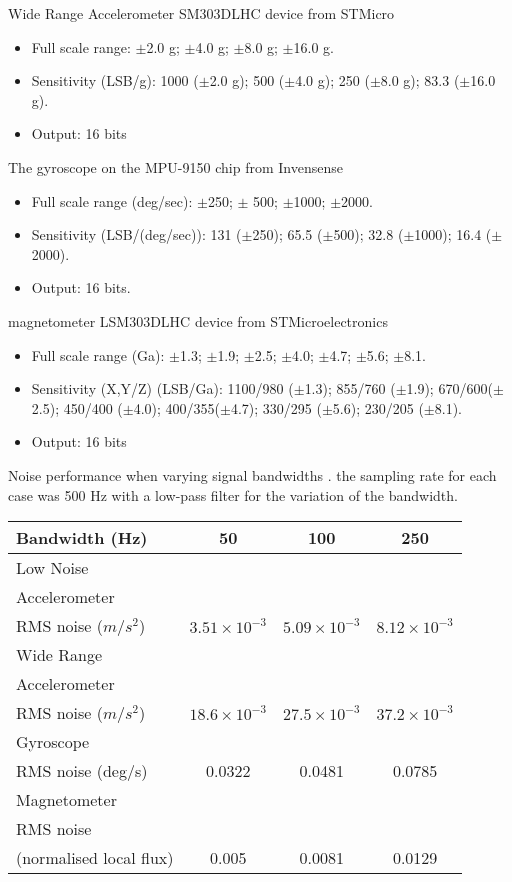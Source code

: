 Wide Range Accelerometer
SM303DLHC
device from STMicro

\begin{itemize}
  \item Full scale range: $\pm$2.0 g; $\pm$4.0 g; $\pm$8.0 g; $\pm$16.0 g.
  \item Sensitivity (LSB/g): 1000 ($\pm$2.0 g); 500 ($\pm$4.0 g); 250 ($\pm$8.0 g);
83.3 ($\pm$16.0 g).
  \item Output: 16 bits
\end{itemize}


The gyroscope on the MPU-9150 chip from Invensense
\begin{itemize}
  \item Full scale range (deg/sec): $\pm$250; $\pm$ 500; $\pm$1000; $\pm$2000.
  \item Sensitivity (LSB/(deg/sec)): 131 ($\pm$250); 65.5 ($\pm$500); 32.8 ($\pm$1000); 16.4 ($\pm$2000).
  \item Output: 16 bits.
\end{itemize}


magnetometer
LSM303DLHC device from
STMicroelectronics
\begin{itemize}
  \item Full scale range (Ga): $\pm$1.3; $\pm$1.9; $\pm$2.5; $\pm$4.0; $\pm$4.7; $\pm$5.6; $\pm$8.1.
  \item Sensitivity (X,Y/Z) (LSB/Ga): 1100/980 ($\pm$1.3); 855/760 ($\pm$1.9); 670/600($\pm$2.5); 450/400 ($\pm$4.0); 400/355($\pm$4.7); 330/295 ($\pm$5.6); 230/205 ($\pm$8.1).
  \item Output: 16 bits
\end{itemize}



Noise performance when varying signal bandwidths .
the sampling rate for each case was 500 Hz with a low-pass
filter for the variation of the bandwidth.


\begin{center}
\begin{tabular}{ |l|c|c|c| }
\hline
Bandwidth (Hz) & 50 & 100 & 250 \\
\hline
Low Noise \\ Accelerometer \\ RMS noise ($m/s^2$) & $3.51 \times 10^{-3}$ & $5.09 \times 10^{-3}$ & $8.12 \times 10^{-3}$\\
Wide Range \\ Accelerometer \\ RMS noise ($m/s^2$) & $18.6 \times 10^{-3}$ & $27.5 \times 10^{-3}$ & $37.2 \times 10^{-3}$\\
Gyroscope \\ RMS noise (deg/s) & 0.0322 & 0.0481 & 0.0785 \\
Magnetometer \\ RMS noise \\ (normalised local flux) & 0.005 & 0.0081 & 0.0129 \\
\hline
\end{tabular}
\end{center}


